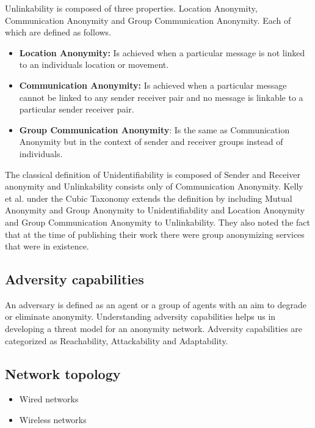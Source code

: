 \documentclass{llncs}
\begin{document}
Unlinkability is composed of three properties. Location Anonymity, Communication Anonymity and Group Communication Anonymity. Each of which are defined as follows.
\begin{itemize}
	\item[]{\textbf{Location Anonymity:} Is achieved when a particular message is not linked to an individuals location or movement.}
	\item[]{\textbf{Communication Anonymity:} Is achieved when a particular message cannot be linked to any sender receiver pair and no message is linkable to a particular sender receiver pair.}
	\item[]{\textbf{Group Communication Anonymity}: Is the same as Communication Anonymity but in the context of sender and receiver groups instead of individuals.}
\end{itemize}

The classical definition of Unidentifiability is composed of Sender and Receiver anonymity and Unlinkability consists only of Communication Anonymity. Kelly et al. \cite{kelly2012exploring} under the Cubic Taxonomy extends the definition by including Mutual Anonymity and Group Anonymity to Unidentifiability and Location Anonymity and Group Communication Anonymity to Unlinkability. They also noted the fact that at the time of publishing their work there were group anonymizing services that were in existence.

\subsection{Adversity capabilities}
An adversary is defined as an agent or a group of agents with an aim to degrade or eliminate anonymity. Understanding adversity capabilities helps us in developing a threat model for an anonymity network. Adversity capabilities are categorized as Reachability, Attackability and Adaptability.


\subsection{ Network topology}
\begin{itemize}
	\item{Wired networks}
	\item{Wireless networks}
\end{itemize}
\end{document}
